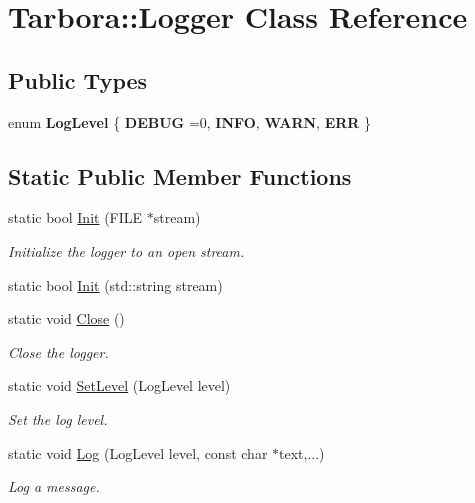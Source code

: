 \hypertarget{classTarbora_1_1Logger}{}\section{Tarbora\+:\+:Logger Class Reference}
\label{classTarbora_1_1Logger}
\subsection*{Public Types}
\begin{DoxyCompactItemize}
\item 
\mbox{\label{classTarbora_1_1Logger_a0596faea258f2da51ad7ca3abd806be3}} 
enum {\bfseries Log\+Level} \{ {\bfseries D\+E\+B\+UG} =0, 
{\bfseries I\+N\+FO}, 
{\bfseries W\+A\+RN}, 
{\bfseries E\+RR}
 \}
\end{DoxyCompactItemize}
\subsection*{Static Public Member Functions}
\begin{DoxyCompactItemize}
\item 
static bool \hyperlink{classTarbora_1_1Logger_abb526de5b2ecd2bda6ec4883de07bec8}{Init} (F\+I\+LE $\ast$stream)
\begin{DoxyCompactList}\small\item\em Initialize the logger to an open stream. \end{DoxyCompactList}\item 
static bool \hyperlink{classTarbora_1_1Logger_a7cc85fb1b154e17f6c7be073399160ac}{Init} (std\+::string stream)
\item 
\mbox{\label{classTarbora_1_1Logger_add4c310a2ab7b0daa730e477853d6c8f}} 
static void \hyperlink{classTarbora_1_1Logger_add4c310a2ab7b0daa730e477853d6c8f}{Close} ()
\begin{DoxyCompactList}\small\item\em Close the logger. \end{DoxyCompactList}\item 
static void \hyperlink{classTarbora_1_1Logger_af2a11244236bad59fce9cc6a1360af29}{Set\+Level} (Log\+Level level)
\begin{DoxyCompactList}\small\item\em Set the log level. \end{DoxyCompactList}\item 
static void \hyperlink{classTarbora_1_1Logger_aa32641fca455178d88f3b1c8b2f552ab}{Log} (Log\+Level level, const char $\ast$text,...)
\begin{DoxyCompactList}\small\item\em Log a message. \end{DoxyCompactList}\end{DoxyCompactItemize}


